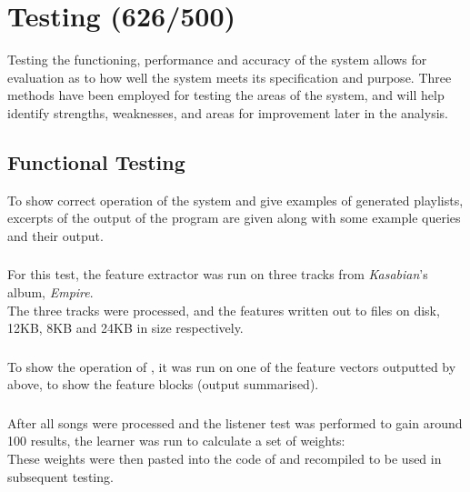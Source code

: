 \chapter{Testing (626/500)}
Testing the functioning, performance and accuracy of the system allows for evaluation as to how well the system meets its specification and purpose. Three methods have been employed for testing the areas of the system, and will help identify strengths, weaknesses, and areas for improvement later in the analysis.
\section{Functional Testing}
\label{text:testing:functional}
To show correct operation of the system and give examples of generated playlists, excerpts of the output of the program are given along with some example queries and their output.
\subsection{}
For this test, the feature extractor was run on three tracks from \emph{Kasabian}'s album, \emph{Empire}.\\

The three tracks were processed, and the features written out to files on disk, 12KB, 8KB and 24KB in size respectively.
\subsection{}
To show the operation of , it was run on one of the feature vectors outputted by  above, to show the feature blocks (output summarised).\\

\subsection{}
After all songs were processed and the listener test was performed to gain around 100 results, the learner was run to calculate a set of weights:\\

These weights were then pasted into the code of  and recompiled to be used in subsequent testing.
\pagebreak
\subsection{}
